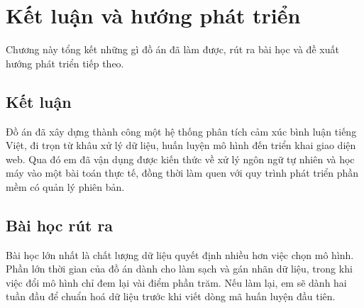 \chapter{Kết luận và hướng phát triển}
\label{ch:ketluan}

\begin{muctieu}
Chương này tổng kết những gì đồ án đã làm được, rút ra bài học và đề xuất
hướng phát triển tiếp theo.
\end{muctieu}

\section{Kết luận}

\begin{chuy}
\end{chuy}

\begin{mau}
Đồ án đã xây dựng thành công một hệ thống phân tích cảm xúc bình luận tiếng
Việt, đi trọn từ khâu xử lý dữ liệu, huấn luyện mô hình đến triển khai giao
diện web. Qua đó em đã vận dụng được kiến thức về xử lý ngôn ngữ tự nhiên và
học máy vào một bài toán thực tế, đồng thời làm quen với quy trình phát
triển phần mềm có quản lý phiên bản.
\end{mau}

\section{Bài học rút ra}

\begin{chuy}
\end{chuy}

\begin{mau}
Bài học lớn nhất là chất lượng dữ liệu quyết định nhiều hơn việc chọn mô
hình. Phần lớn thời gian của đồ án dành cho làm sạch và gán nhãn dữ liệu,
trong khi việc đổi mô hình chỉ đem lại vài điểm phần trăm. Nếu làm lại, em
sẽ dành hai tuần đầu để chuẩn hoá dữ liệu trước khi viết dòng mã huấn luyện
đầu tiên.
\end{mau}


